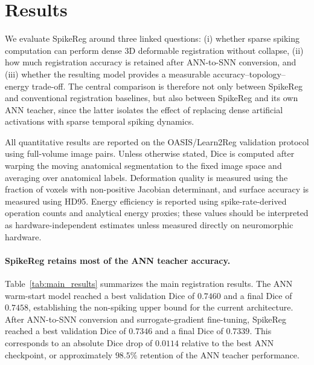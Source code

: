 \section{Results}


We evaluate SpikeReg around three linked questions: 
(i) whether sparse spiking computation can perform dense 3D deformable registration without collapse, 
(ii) how much registration accuracy is retained after ANN-to-SNN conversion, and 
(iii) whether the resulting model provides a measurable accuracy--topology--energy trade-off. 
The central comparison is therefore not only between SpikeReg and conventional registration baselines, but also between SpikeReg and its own ANN teacher, since the latter isolates the effect of replacing dense artificial activations with sparse temporal spiking dynamics.

All quantitative results are reported on the OASIS/Learn2Reg validation protocol using full-volume image pairs. Unless otherwise stated, Dice is computed after warping the moving anatomical segmentation to the fixed image space and averaging over anatomical labels. Deformation quality is measured using the fraction of voxels with non-positive Jacobian determinant, and surface accuracy is measured using HD95. Energy efficiency is reported using spike-rate-derived operation counts and analytical energy proxies; these values should be interpreted as hardware-independent estimates unless measured directly on neuromorphic hardware.


\paragraph{SpikeReg retains most of the ANN teacher accuracy.}
Table~\ref{tab:main_results} summarizes the main registration results. The ANN warm-start model reached a best validation Dice of $0.7460$ and a final Dice of $0.7458$, establishing the non-spiking upper bound for the current architecture. After ANN-to-SNN conversion and surrogate-gradient fine-tuning, SpikeReg reached a best validation Dice of $0.7346$ and a final Dice of $0.7339$. This corresponds to an absolute Dice drop of $0.0114$ relative to the best ANN checkpoint, or approximately $98.5\%$ retention of the ANN teacher performance.

